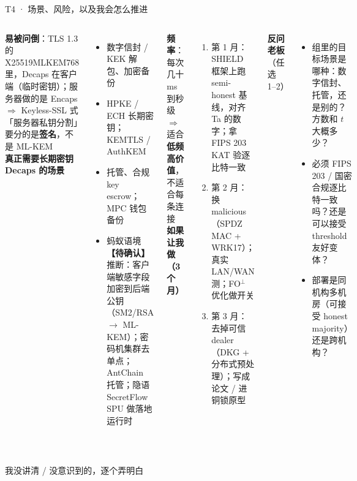 \documentclass[aspectratio=169,10pt,fontset=none]{ctexbeamer}
\newcommand{\warn}[1]{{\color{warn}\textbf{【待确认】}#1}}
\begin{document}
\begin{frame}{T4 · 场景、风险，以及我会怎么推进}
\begin{columns}[T]
\textbf{易被问倒}：\alert{TLS 1.3 的 X25519MLKEM768 里，Decaps 在客户端（临时密钥）}；服务器做的是 Encaps $\Rightarrow$ Keyless-SSL 式「服务器私钥分割」要分的是\textbf{签名}，不是 ML-KEM\\[3pt]
\textbf{真正需要长期密钥 Decaps 的场景}
\begin{itemize}
  \item 数字信封 / KEK 解包、加密备份
  \item HPKE / ECH 长期密钥；KEMTLS / AuthKEM
  \item 托管、合规 key escrow；MPC 钱包备份
  \item 蚂蚁语境 \warn{推断}：客户端敏感字段加密到后端公钥（SM2/RSA $\to$ ML-KEM）；密码机集群去单点；AntChain 托管；隐语 SecretFlow SPU 做落地运行时
\end{itemize}
\textbf{频率}：每次几十 ms 到秒级 $\Rightarrow$ 适合\textbf{低频高价值}，不适合每条连接
\textbf{如果让我做（3 个月）}
\begin{enumerate}
  \item 第 1 月：SHIELD 框架上跑 semi-honest 基线，对齐 Ta 的数字；拿 FIPS 203 KAT 验逐比特一致
  \item 第 2 月：换 malicious（SPDZ MAC + WRK17）；真实 LAN/WAN 测；FO$^\perp$ 优化做开关
  \item 第 3 月：去掉可信 dealer（DKG + 分布式预处理）；写成论文 / 进铜锁原型
\end{enumerate}
\textbf{反问老板}（任选 1--2）
\begin{itemize}
  \item 组里的目标场景是哪种：数字信封、托管，还是别的？方数和 $t$ 大概多少？
  \item 必须 FIPS 203 / 国密合规逐比特一致吗？还是可以接受 threshold 友好变体？
  \item 部署是同机构多机房（可接受 honest majority）还是跨机构？
\end{itemize}
\end{columns}
\end{frame}
\begin{frame}
\vfill{}\\[6pt]{\normalsize 我没讲清 / 没意识到的，逐个弄明白}\vfill
\end{frame}
\end{document}
